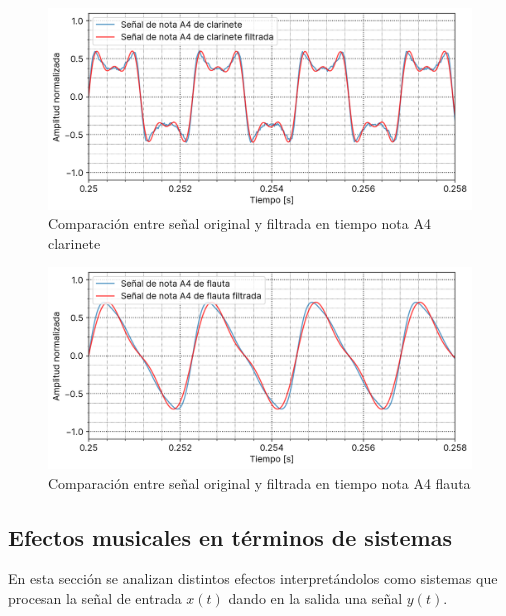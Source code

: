 \documentclass[12pt]{article}
\begin{document}
\begin{figure}[H]
\centering
\includegraphics{plot/a4_clarinete_cutoff_time_comparison.png}
\caption{Comparación entre señal original y filtrada en tiempo nota A4 clarinete}
\label{a4_clarinete_cutoff_time_comparison}
\end{figure}

\begin{figure}[H]
\centering
\includegraphics{plot/a4_flauta_cutoff_time_comparison.png}
\caption{Comparación entre señal original y filtrada en tiempo nota A4 flauta}
\label{a4_flauta_cutoff_time_comparison}
\end{figure}



\hypertarget{Efectos-musicales-en-términos-de-sistemas}{%
\subsection{Efectos musicales en términos de sistemas}\label{Efectos-musicales-en-términos-de-sistemas}}

En esta sección se analizan distintos efectos interpretándolos como sistemas que procesan la señal de entrada $x(t)$ dando en la salida una señal $y(t)$. 

\end{document}
